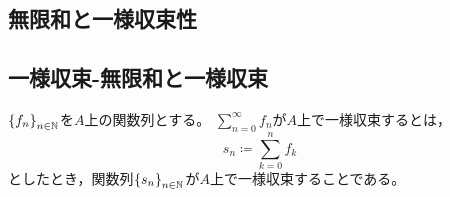 \documentclass[b5paper,draft]{ltjsbook}
\begin{document}
\subsection{無限和と一様収束性}\subsection{一様収束-無限和と一様収束}

\begin{defi}[関数列の無限和]
    $\seq{f_n}{n\in\N}$を$A$上の関数列とする。
    $\sum_{n=0}^\infty f_n$が$A$上で一様収束するとは，
    \begin{equation}
        s_n\coloneqq\sum_{k=0}^n f_k
    \end{equation}
    としたとき，関数列$\seq{s_n}{n\in\N}$が$A$上で一様収束することである。
\end{defi}
\end{document}
